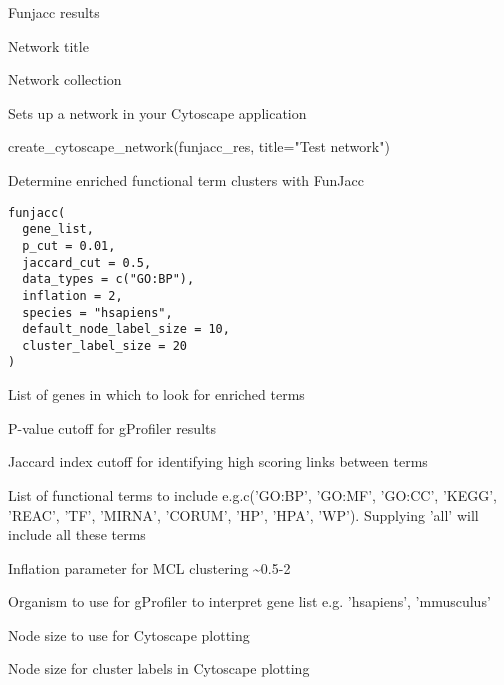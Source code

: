 \documentclass[a4paper]{book}
\begin{document}
%
\begin{Arguments}
\begin{ldescription}
\item[\code{funjacc\_results}] Funjacc results

\item[\code{title}] Network title

\item[\code{collection}] Network collection
\end{ldescription}
\end{Arguments}
%
\begin{Value}
Sets up a network in your Cytoscape application
\end{Value}
%
\begin{Examples}
\begin{ExampleCode}
create_cytoscape_network(funjacc_res, title="Test network")
\end{ExampleCode}
\end{Examples}
%
\begin{Description}
Determine enriched functional term clusters with FunJacc
\end{Description}
%
\begin{Usage}
\begin{verbatim}
funjacc(
  gene_list,
  p_cut = 0.01,
  jaccard_cut = 0.5,
  data_types = c("GO:BP"),
  inflation = 2,
  species = "hsapiens",
  default_node_label_size = 10,
  cluster_label_size = 20
)
\end{verbatim}
\end{Usage}
%
\begin{Arguments}
\begin{ldescription}
\item[\code{gene\_list}] List of genes in which to look for enriched terms

\item[\code{p\_cut}] P-value cutoff for gProfiler results

\item[\code{jaccard\_cut}] Jaccard index cutoff for identifying high scoring links between terms

\item[\code{data\_types}] List of functional terms to include e.g.c('GO:BP', 'GO:MF', 'GO:CC', 'KEGG', 'REAC', 'TF', 'MIRNA', 'CORUM', 'HP', 'HPA', 'WP'). Supplying 'all' will include all these terms

\item[\code{inflation}] Inflation parameter for MCL clustering \textasciitilde{}0.5-2

\item[\code{species}] Organism to use for gProfiler to interpret gene list e.g. 'hsapiens', 'mmusculus'

\item[\code{default\_node\_label\_size}] Node size to use for Cytoscape plotting

\item[\code{cluster\_label\_size}] Node size for cluster labels in Cytoscape plotting
\end{ldescription}
\end{Arguments}
\end{document}
